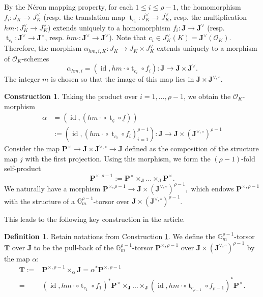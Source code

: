 \documentclass[11pt,oneside]{amsart}
\theoremstyle{plain}
\theoremstyle{definition}
\newtheorem{definition}[theorem]{Definition}
\newtheorem{construction}[theorem]{Construction}
\def\lra{{\longrightarrow}}
\def\G{{\bf G}}
\DeclareMathOperator{\id}{id} \DeclareMathOperator{\Sel}{Sel}
\DeclareMathOperator{\tr}{t}
\def\TT{\mathbf{T}}
\def\J{\mathbf{J}}
\def\Jo{\mathbf{J}^{\vee,\circ}}
\def\G{\mathbb{G}}
\def\P{\mathbf{P}}
\def\oh{\mathcal{O}}
\begin{document}
By the N\'eron mapping property, for each $1\leq i\leq \rho-1$, the homomorphism $f_i : J_K\lra J_K^\vee$ (resp. the translation map $\tr_{c_i} : J_K^\vee \lra J_K^\vee$, resp.  the multiplication $hm\cdot : J_K^\vee \lra J_K^\vee$) extends uniquely to a homomorphism  $f_i : \J\lra \J^\vee$ (resp.  $\tr_{c_i} : \J^\vee \lra \J^\vee$, resp.  $hm\cdot : \J^\vee \lra \J^\vee$).  Note that $c_i\in J_K^\vee(K) =  \J^\vee(\oh_K)$. Therefore, the morphism $\alpha_{hm, i, K} : J_K\lra J_K\times J_K^\vee$ extends uniquely to a morphism of $\oh_K$-schemes 
$$\alpha_{hm, i} = (\id, hm\cdot \circ \tr_{c_i} \circ f_i): \J\lra  \J\times \J^\vee.$$  
The integer $m$ is chosen so that the image of this map lies in $\J\times \Jo$. 

\begin{construction} \label{map:alpha} 
Taking the product over $i=1, \ldots, \rho-1$, we obtain the $\oh_K$-morphism
\begin{align*} 
    \alpha & =(\id, ({hm\cdot} \circ \tr_{\underline{c}} \circ \underline{f})) \\
    & :=(\id, ({hm\cdot} \circ \tr_{c_i} \circ f_i)_{i=1}^{\rho-1}) : \J \lra \J\times (\Jo)^{\rho-1}
\end{align*}
Consider the map $\P^\times \rightarrow \J \times \Jo \rightarrow \J$ defined as the composition of the structure map $j$ with the first projection. Using this morphism, we form the $(\rho-1)$-fold self-product 
$$
    \P^{\times, \rho-1}:= \P^\times \times_{\J} \ldots \times_{\J} \P^\times.
$$
We naturally have a morphism
$    \P^{\times, \rho-1} \lra \J\times (\Jo)^{\rho-1},$
which endows $\P^{\times, \rho-1}$ with the structure of a $\G_m^{\rho-1}$-torsor over $\J\times (\Jo)^{\rho-1}$.
\end{construction}
 

This leads to the following key construction in the article. 
\begin{definition}Retain notations from Construction \ref{map:alpha}. We define the $\G_m^{\rho-1}$-torsor $\TT$ over $\J$ to be the pull-back of the $\G_m^{\rho-1}$-torsor $\P^{\times, \rho-1}$ over $\J\times (\Jo)^{\rho-1}$ by the map $\alpha$:
\begin{align*}
    \TT:= & \P^{\times, \rho-1}\times_{\alpha} \J=\alpha^* \P^{\times, \rho-1} \\ = &
    (\id, hm\cdot \circ \tr_{c_1} \circ f_1)^* \P^\times\times_{\J} \ldots \times_{\J}(\id, hm\cdot \circ \tr_{c_{\rho-1}} \circ f_{\rho-1})^* \P^\times.
\end{align*}
\end{definition}
\end{document}

